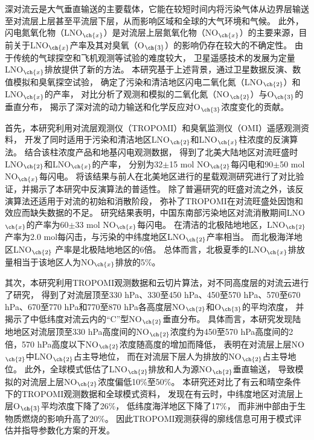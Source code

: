
\abstract
{
深对流云是大气垂直输送的主要载体，它能在较短时间内将污染气体从边界层输送至对流层上层甚至平流层下层，从而影响区域和全球的大气环境和气候。
此外，闪电氮氧化物（LNO$_{\ch{x}}$）是对流层上层氮氧化物（NO$_{\ch{x}}$）的主要来源，目前关于LNO$_{\ch{x}}$产率及其对臭氧（O$_{\ch{3}}$）的影响仍存在较大的不确定性。
由于传统的气球探空和飞机观测等试验的难度较大，
卫星遥感技术的发展为定量LNO$_{\ch{x}}$排放提供了新的方法。
本研究基于上述背景，通过卫星数据反演、数值模拟和臭氧探空试验，
确定了污染和清洁地区闪电二氧化氮（LNO$_{\ch{2}}$）和LNO$_{\ch{x}}$的产率，
对比分析了观测和模拟的二氧化氮（NO$_{\ch{2}}$）与O$_{\ch{3}}$的垂直分布，
揭示了深对流的动力输送和化学反应对O$_{\ch{3}}$浓度变化的贡献。

首先，本研究利用对流层观测仪（TROPOMI）和臭氧监测仪（OMI）遥感观测资料，
开发了同时适用于污染和清洁地区LNO$_{\ch{2}}$和LNO$_{\ch{x}}$柱浓度的反演算法。
结合该柱浓度产品和地基闪电观测数据，
得到了北美大陆地区对流旺盛时LNO$_{\ch{2}}$和LNO$_{\ch{x}}$的产率，
分别为32$\pm$15 mol NO$_{\ch{2}}$每闪电和90$\pm$50 mol NO$_{\ch{x}}$每闪电。
将该结果与前人在北美地区进行的星载观测研究进行了对比验证，并揭示了本研究中反演算法的普适性。
除了普遍研究的旺盛对流之外，该反演算法还适用于对流的初始和消散阶段，
弥补了TROPOMI在对流旺盛处因饱和效应而缺失数据的不足。
研究结果表明，中国东南部污染地区对流消散期间LNO$_{\ch{x}}$的产率为60$\pm$33 mol NO$_{\ch{x}}$每闪电。
在清洁的北极陆地地区，LNO$_{\ch{2}}$产率为2.0 mol每闪击，与污染的中纬度地区LNO$_{\ch{2}}$产率相当。
而北极海洋地区LNO$_{\ch{2}}$ 产率是北极陆地地区的6倍。
总体而言，北极夏季的LNO$_{\ch{x}}$排放量相当于该地区人为NO$_{\ch{x}}$排放的5\%。

其次，本研究利用TROPOMI观测数据和云切片算法，对不同高度层的对流云进行了研究，
得到了对流层顶至330 hPa、330至450 hPa、450至570 hPa、570至670 hPa、670至770 hPa和770至870 hPa各高度层NO$_{\ch{2}}$和O$_{\ch{3}}$的平均浓度，
并揭示了中低纬度对流云内的“C”型NO$_{\ch{2}}$垂直分布。
具体而言，本研究发现陆地地区对流层顶至330 hPa高度间的NO$_{\ch{2}}$浓度约为450至570 hPa高度间的2倍，570 hPa高度以下NO$_{\ch{2}}$浓度随高度的增加而降低，
表明在对流层上层NO$_{\ch{2}}$中LNO$_{\ch{2}}$占主导地位，
而在对流层下层人为排放的NO$_{\ch{2}}$占主导地位。
此外，全球模式低估了LNO$_{\ch{2}}$排放和人为源NO$_{\ch{2}}$垂直输送，
导致模拟的对流层上层NO$_{\ch{2}}$浓度偏低10\%至50\%。
本研究还对比了有云和晴空条件下的TROPOMI观测数据和全球模式资料，
发现在有云时，中纬度地区对流层上层O$_{\ch{3}}$平均浓度下降了26\%，
低纬度海洋地区下降了17\%，
而非洲中部由于生物质燃烧的影响升高了20\%。
因此TROPOMI观测获得的廓线信息可用于模式评估并指导参数化方案的开发。

}
